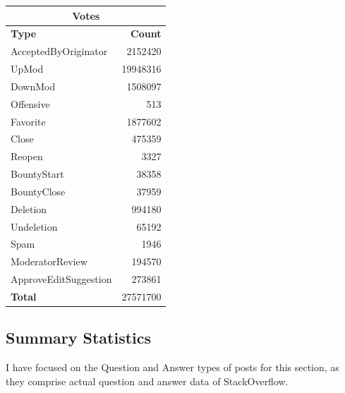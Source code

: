 \documentclass{article}
\begin{document}
\begin{table}[h]
\begin{minipage}[t]{0.45\linewidth}
\begin{tabular}[t]{| l | r |}
\hline
\multicolumn{2}{|c|}{Votes} \\ \hline
\bf{Type} & \bf{Count} \\ \hline
AcceptedByOriginator& 2152420  \\ \hline    
UpMod& 19948316  \\ \hline    
DownMod& 1508097 \\ \hline    
Offensive& 513 \\ \hline    
Favorite& 1877602 \\ \hline    
Close& 475359 \\ \hline    
Reopen& 3327 \\ \hline    
BountyStart& 38358 \\ \hline    
BountyClose& 37959 \\ \hline    
Deletion& 994180 \\ \hline    
Undeletion& 65192 \\ \hline    
Spam& 1946 \\ \hline    
ModeratorReview& 194570 \\ \hline    
ApproveEditSuggestion& 273861 \\ \hline 
\bf{Total} & 27571700 \\ \hline   
\end{tabular}
\end{minipage}
\end{table}

\subsection{Summary Statistics}

I have focused on the Question and Answer types of posts for this section, as they comprise actual question and answer data of StackOverflow.
\end{document}
